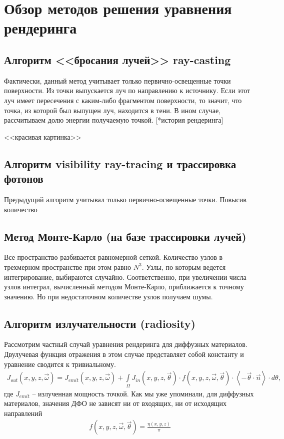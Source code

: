 \section*{Обзор методов решения уравнения рендеринга} 

\subsection*{Алгоритм <<бросания лучей>> ray-casting}

Фактически, данный метод учитывает только первично-освещенные точки поверхности. Из точки выпускается луч по направлению к источнику. Если этот луч имеет пересечения с каким-либо фрагментом поверхности, то значит, что точка, из которой был выпущен луч, находится в тени. В ином случае, рассчитываем долю энергии получаемую точкой. [*история рендеринга]

<<красивая картинка>>


\subsection*{Алгоритм visibility ray-tracing и трассировка фотонов}

Предыдущий алгоритм учитывал только первично-освещенные точки. Повысив количество 



\subsection*{Метод Монте-Карло (на базе трассировки лучей)}

Все пространство разбивается равномерной сеткой. Количество узлов в трехмерном пространстве при этом равно $N^3$. Узлы, по которым ведется интегрирование, выбираются случайно. Соответственно, при увеличении числа узлов интеграл, вычисленный методом Монте-Карло, приближается к точному значению. Но при недостаточном количестве узлов получаем шумы. 

\subsection*{Алгоритм излучательности (radiosity)}
Рассмотрим частный случай уравнения рендеринга для диффузных материалов. Двулучевая функция отражения в этом случае представляет собой константу и уравнение сводится к тривиальному.
\begin{gather}
  J_{out}(x,y,z,\vec \omega) = J_{emit}(x,y,z,\vec \omega) + \int \limits_\Omega J_{in}(x,y,z,\vec \theta) \cdot f(x,y,z,\vec \omega,\vec \theta) \cdot \left\langle  {-\vec \theta \cdot \vec n} \right\rangle \cdot d\theta,
\end{gather}
где $J_{emit}$ -- излученная мощность точкой. Как мы уже упоминали, для диффузных материалов, значения ДФО не зависят ни от входящих, ни от исходящих направлений
\begin{gather}
  f(x,y,z,\vec \omega,\vec \theta) = \frac{\eta (x,y,z)}{\pi}
\end{gather}

